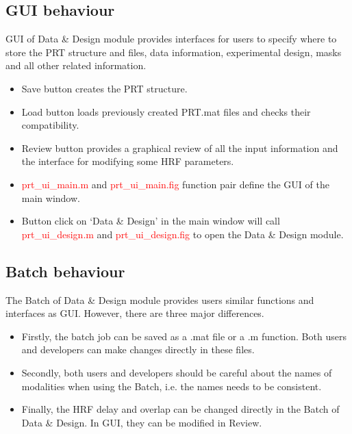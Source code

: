 \subsection{GUI behaviour}

GUI of Data \& Design module provides interfaces for users to specify where to store the PRT structure and files, data information, experimental design, masks and all other related information.

\begin{itemize}
\item Save button creates the PRT structure.
\item Load button loads previously created PRT.mat files and checks their compatibility.
\item Review button provides a graphical review of all the input information and the interface for modifying some HRF parameters.
\item \textcolor{red}{prt\_ui\_main.m} and \textcolor{red}{prt\_ui\_main.fig} function pair define the GUI of the main window.
\item Button click on `Data \& Design' in the main window will call \textcolor{red}{prt\_ui\_design.m} and \textcolor{red}{prt\_ui\_design.fig} to open the Data \& Design module.
\end{itemize}




\subsection{Batch behaviour}

The Batch of Data \& Design module provides users similar functions and interfaces as GUI. However, there are three major differences.

\begin{itemize}
    \item Firstly, the batch job can be saved as a .mat file or a .m function. Both users and developers can make changes directly in these files.
    \item Secondly, both users and developers should be careful about the names of modalities when using the Batch, i.e. the names needs to be consistent.
    \item Finally, the HRF delay and overlap can be changed directly in the Batch of Data \& Design. In GUI, they can be modified in Review.
\end{itemize}

